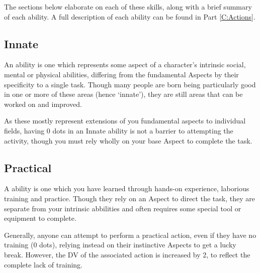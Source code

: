 The sections below elaborate on each of these skills, along with a brief summary of each ability. A full description of each ability can be found in Part \ref{C:Actions}.


\subsection{Innate}

An  ability is one which represents some aspect of a character's intrinsic social, mental or physical abilities, differing from the fundamental Aspects by their specificity to a single task. Though many people are born being particularly good in one or more of these areas (hence `innate'), they are still areas that can be worked on and improved. 

As these mostly represent extensions of you fundamental aspects to individual fields, having 0 dots in an Innate ability is not a barrier to attempting the activity, though you must rely wholly on your base Aspect to complete the task. 

\abilityTable
{
}


\newpage
\subsection{Practical}

A  ability is one which you have learned through hands-on experience, laborious training and practice. Though they rely on an Aspect to direct the task, they are separate from your intrinsic abbilities and often requires some special tool or equipment to complete. 

Generally, anyone can attempt to perform a practical action, even if they have no training (0 dots), relying instead on their instinctive Aspects to get a lucky break. However, the DV of the associated action is increased by 2, to reflect the complete lack of training. 
 

